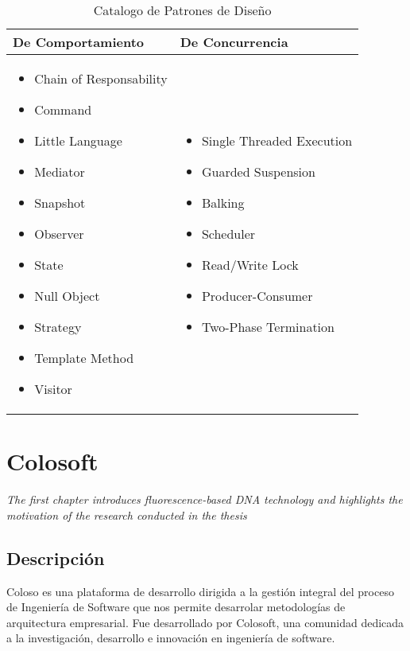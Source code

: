   \begin{table}[!h]
  	\centering
  	\begin{tabular}{p{7cm}|p{7cm}}  		
  		\midrule
  		\textbf{De Comportamiento} & \textbf{De Concurrencia} \\
  		\midrule
  		\begin{itemize}
  			\item Chain of Responsability
  			\item Command
  			\item Little Language
  			\item Mediator
  			\item Snapshot
  			\item Observer
  			\item State
  			\item Null Object
  			\item Strategy
  			\item Template Method
  			\item Visitor
  		\end{itemize} &
  		\begin{itemize}
  			\item Single Threaded Execution
  			\item Guarded Suspension
  			\item Balking
  			\item Scheduler
  			\item Read/Write Lock
  			\item Producer-Consumer
  			\item Two-Phase Termination
  		\end{itemize} \\
  		\bottomrule
  	\end{tabular}
  	\captionsetup{width=.95\textwidth}
  	\caption{Catalogo de Patrones de Diseño}
  	\label{tabla3} 
  \end{table}

\chapter{Colosoft}
\label{chap:coloso}
\textit{The first chapter introduces fluorescence-based DNA technology and highlights the motivation of the research conducted in the thesis}
\vfill
\minitoc
\newpage

\section{Descripción}
Coloso es una plataforma de desarrollo dirigida a la gestión integral del proceso de
Ingeniería de Software que nos permite desarrolar metodologías de arquitectura empresarial.
Fue desarrollado por Colosoft, una comunidad dedicada a la investigación, desarrollo e
innovación en ingeniería de software. \\


